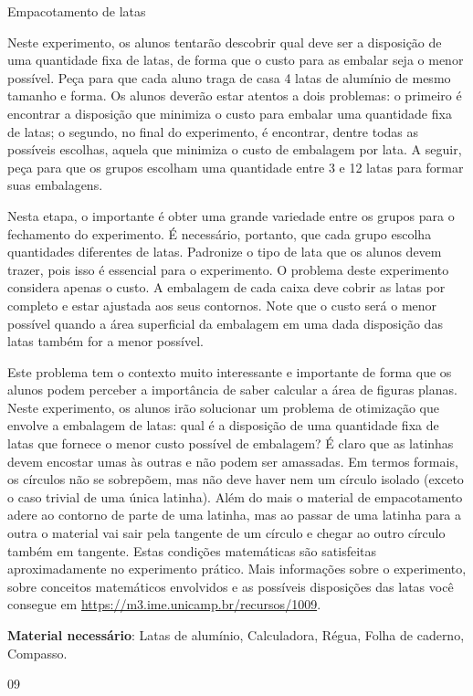 \begin{sugestions}{Empacotamento de latas}
{
  Neste experimento, os alunos tentarão descobrir qual deve ser a disposição de uma quantidade fixa de latas, de forma que o custo para as embalar seja o menor possível. Peça para que cada aluno traga de casa 4 latas de alumínio de mesmo tamanho e forma. Os alunos deverão estar atentos a dois problemas: o primeiro é encontrar a disposição que minimiza o custo para embalar uma quantidade fixa de latas; o segundo, no final do experimento, é encontrar, dentre todas as possíveis escolhas, aquela que minimiza o custo de embalagem por lata. A seguir, peça para que os grupos escolham uma quantidade entre 3 e 12 latas para formar suas embalagens. 

  Nesta etapa, o importante é obter uma grande variedade entre os grupos para o fechamento do experimento. É necessário, portanto, que cada grupo escolha quantidades diferentes de latas. Padronize o tipo de lata que os alunos devem trazer, pois isso é essencial para o experimento. O problema deste experimento considera apenas o custo. A embalagem de cada caixa deve cobrir as latas por completo e estar ajustada aos seus contornos. Note que o custo será o menor possível quando a área superficial da embalagem em uma dada disposição das latas também for a menor possível. 

  Este problema tem o contexto muito interessante e importante de forma que os alunos podem perceber a importância de saber calcular a área de figuras planas. Neste experimento, os alunos irão solucionar um problema de otimização que envolve a embalagem de latas: qual é a disposição de uma quantidade fixa de latas que fornece o menor custo possível de embalagem? É claro que as latinhas devem encostar umas às outras e não podem ser amassadas. Em termos formais, os círculos não se sobrepõem, mas não deve haver nem um círculo isolado (exceto o caso trivial de uma única latinha). Além do mais o material de empacotamento adere ao contorno de parte de uma latinha, mas ao passar de uma latinha para a outra o material vai sair pela tangente de um círculo e chegar ao outro círculo também em tangente. Estas condições matemáticas são satisfeitas aproximadamente no experimento prático. Mais informações sobre o experimento, sobre conceitos matemáticos envolvidos e as possíveis disposições das latas você consegue em \url{https://m3.ime.unicamp.br/recursos/1009}. 

  \textbf{Material necessário}: Latas de alumínio, Calculadora, Régua, Folha de caderno, Compasso.
}{0}{9}
\end{sugestions}
